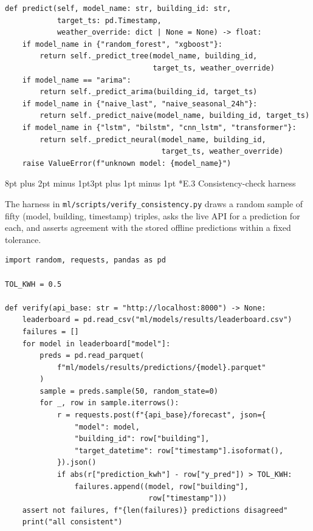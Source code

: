 \documentclass[12pt,a4paper,openany]{report}
\makeatletter
\renewcommand{\subsection}{\@startsection{subsection}{2}{\z@}%
  {8pt plus 2pt minus 1pt}{3pt plus 1pt minus 1pt}%
  {\normalfont\normalsize\bfseries}}
\makeatother
\begin{document}
{\small\begin{verbatim}
def predict(self, model_name: str, building_id: str,
            target_ts: pd.Timestamp,
            weather_override: dict | None = None) -> float:
    if model_name in {"random_forest", "xgboost"}:
        return self._predict_tree(model_name, building_id,
                                  target_ts, weather_override)
    if model_name == "arima":
        return self._predict_arima(building_id, target_ts)
    if model_name in {"naive_last", "naive_seasonal_24h"}:
        return self._predict_naive(model_name, building_id, target_ts)
    if model_name in {"lstm", "bilstm", "cnn_lstm", "transformer"}:
        return self._predict_neural(model_name, building_id,
                                    target_ts, weather_override)
    raise ValueError(f"unknown model: {model_name}")
\end{verbatim}}

\subsection*{E.3 Consistency-check harness}

The harness in \texttt{ml/scripts/verify\_consistency.py} draws a random sample of fifty (model, building, timestamp) triples, asks the live API for a prediction for each, and asserts agreement with the stored offline predictions within a fixed tolerance.

{\small\begin{verbatim}
import random, requests, pandas as pd

TOL_KWH = 0.5

def verify(api_base: str = "http://localhost:8000") -> None:
    leaderboard = pd.read_csv("ml/models/results/leaderboard.csv")
    failures = []
    for model in leaderboard["model"]:
        preds = pd.read_parquet(
            f"ml/models/results/predictions/{model}.parquet"
        )
        sample = preds.sample(50, random_state=0)
        for _, row in sample.iterrows():
            r = requests.post(f"{api_base}/forecast", json={
                "model": model,
                "building_id": row["building"],
                "target_datetime": row["timestamp"].isoformat(),
            }).json()
            if abs(r["prediction_kwh"] - row["y_pred"]) > TOL_KWH:
                failures.append((model, row["building"],
                                 row["timestamp"]))
    assert not failures, f"{len(failures)} predictions disagreed"
    print("all consistent")
\end{verbatim}}
\end{document}
